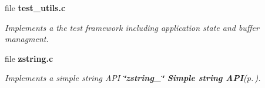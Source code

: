 \begin{CompactItemize}
\item 
file {\bf test\_\-utils.c}
\begin{CompactList}\small\item\em Implements a the test framework including application state and buffer managment. \item\end{CompactList}

\item 
file {\bf zstring.c}
\begin{CompactList}\small\item\em Implements a simple string API {\bf \char`\"{}zstring\_\-\char`\"{} Simple string API}{\rm (p.\,\pageref{group__zstring})}. \item\end{CompactList}

\end{CompactItemize}
